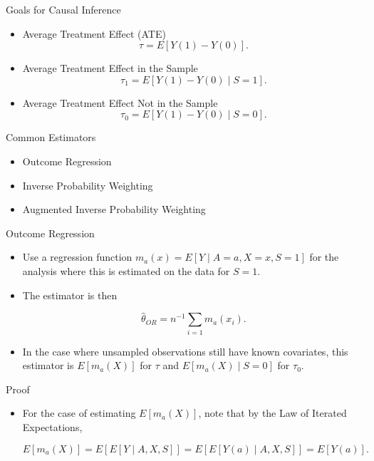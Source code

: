 \documentclass[handout]{beamer} %
\begin{document}
\begin{frame}{Goals for Causal Inference}

\begin{itemize}
    \item Average Treatment Effect (ATE)
      \[\tau = E[Y(1) - Y(0)].\]
    \item Average Treatment Effect in the Sample
      \[\tau_1 = E[Y(1) - Y(0) \mid S = 1].\]
    \item Average Treatment Effect Not in the Sample
      \[\tau_0 = E[Y(1) - Y(0) \mid S = 0].\]
\end{itemize}

\end{frame}

\begin{frame}{Common Estimators}

\begin{itemize}
    \item Outcome Regression
    \item Inverse Probability Weighting
    \item Augmented Inverse Probability Weighting
\end{itemize}

\end{frame}

\begin{frame}{Outcome Regression}

\begin{itemize}
  \item Use a regression function $m_a(x) = E[Y \mid A = a, X = x, S = 1]$
    for the analysis where this is estimated on the data for $S = 1$.
  \item The estimator is then

    \[\hat \theta_{OR} = n^{-1} \sum_{i = 1} \hat m_a(x_i).\]

  \item In the case where unsampled observations still have known covariates,
    this estimator is $E[m_a(X)]$ for $\tau$ and $E[m_a(X) \mid S = 0]$ for 
    $\tau_0$.
\end{itemize}

\end{frame}

\begin{frame}{Proof}

\begin{itemize}
  \item For the case of estimating $E[m_a(X)]$, note that by the Law of 
    Iterated Expectations,

    \[E[m_a(X)] = E[E[Y \mid A, X, S]] = E[E[Y(a) \mid A, X, S]] = E[Y(a)].\]
\end{itemize}

\end{frame}
\end{document}
